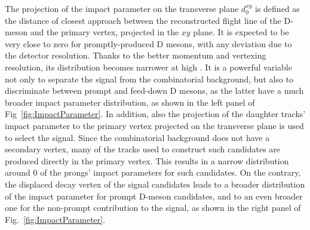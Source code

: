 The projection of the impact parameter on the transverse plane $d_0^{xy}$ is defined as the distance of closest approach between the reconstructed flight line of the D-meson and the primary vertex, projected in the $xy$ plane. It is expected to be very close to zero for promptly-produced D mesons, with any deviation due to the detector resolution. Thanks to the better momentum and vertexing resolution, its distribution becomes narrower at high \pt. It is a powerful variable not only to separate the signal from the combinatorial background, but also to discriminate between prompt and feed-down D mesons, as the latter have a much broader impact parameter distribution, as shown in the left panel of Fig~\ref{fig:ImpactParameter}. In addition, also the projection of the daughter tracks' impact parameter to the primary vertex projected on the transverse plane is used to select the signal. Since the combinatorial background does not have a secondary vertex, many of the tracks used to construct such candidates are produced directly in the primary vertex. This results in a narrow distribution around 0 of the prongs' impact parameters for such candidates. On the contrary, the displaced decay vertex of the signal candidates leads to a broader distribution of the impact parameter for prompt D-meson candidates, and to an even broader one for the non-prompt contribution to the signal, as shown in the right panel of Fig.~\ref{fig:ImpactParameter}.

